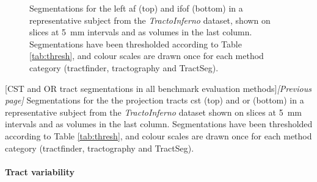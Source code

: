 \begin{figure}[hp!]
  \begin{subfigure}{\textwidth}
    \makebox[\linewidth][r]{%
    }
  \end{subfigure}
  \begin{subfigure}{\textwidth}
    \makebox[\linewidth][r]{%
    }
  \end{subfigure}
  \caption[AF and IFOF tract segmentations in all benchmark evaluation methods]{Segmentations for the left \gls{af} (top) and \gls{ifof} (bottom) in a representative subject from the \textit{TractoInferno} dataset, shown on slices at 5~mm intervals and as volumes in the last column. Segmentations have been thresholded according to Table \ref{tab:thresh}, and colour scales are drawn once for each method category (tractfinder, tractography and TractSeg).}
  \label{fig:lb.afifof}
\end{figure}
\begin{figure}[htb!]
  \centering
  \begin{subfigure}{\textwidth}
    \makebox[\linewidth][r]{%
    }
  \end{subfigure}
  \begin{subfigure}{\textwidth}
    \makebox[\linewidth][r]{%
    }
  \end{subfigure}
\end{figure}
\clearpage\addtocounter{figure}{-1} %
{[CST and OR tract segmentations in all benchmark evaluation methods]{\textit{[Previous page]} Segmentations for the the projection tracts \gls{cst} (top) and \gls{or} (bottom) in a representative subject from the \textit{TractoInferno} dataset shown on slices at 5~mm intervals and as volumes in the last column. Segmentations have been thresholded according to Table \ref{tab:thresh}, and colour scales are drawn once for each method category (tractfinder, tractography and TractSeg). \label{fig:lb.cstor}}
}

\paragraph*{Tract variability}

